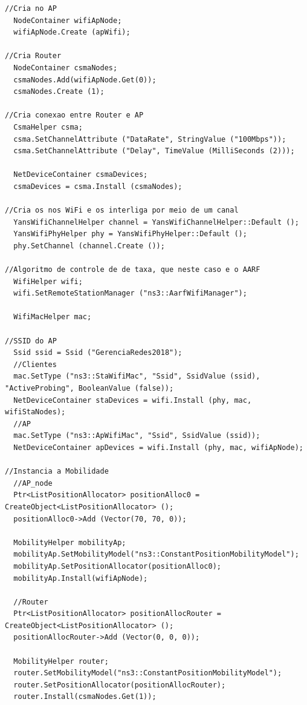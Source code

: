 \documentclass[12pt]{article}
\begin{document}
\begin{lstlisting}
//Cria no AP
  NodeContainer wifiApNode;
  wifiApNode.Create (apWifi);

//Cria Router
  NodeContainer csmaNodes;
  csmaNodes.Add(wifiApNode.Get(0));
  csmaNodes.Create (1);

//Cria conexao entre Router e AP
  CsmaHelper csma;
  csma.SetChannelAttribute ("DataRate", StringValue ("100Mbps"));
  csma.SetChannelAttribute ("Delay", TimeValue (MilliSeconds (2)));

  NetDeviceContainer csmaDevices;
  csmaDevices = csma.Install (csmaNodes);

//Cria os nos WiFi e os interliga por meio de um canal
  YansWifiChannelHelper channel = YansWifiChannelHelper::Default ();
  YansWifiPhyHelper phy = YansWifiPhyHelper::Default ();
  phy.SetChannel (channel.Create ());

//Algoritmo de controle de de taxa, que neste caso e o AARF
  WifiHelper wifi;
  wifi.SetRemoteStationManager ("ns3::AarfWifiManager");

  WifiMacHelper mac;

//SSID do AP
  Ssid ssid = Ssid ("GerenciaRedes2018");
  //Clientes
  mac.SetType ("ns3::StaWifiMac", "Ssid", SsidValue (ssid), "ActiveProbing", BooleanValue (false));
  NetDeviceContainer staDevices = wifi.Install (phy, mac, wifiStaNodes);
  //AP
  mac.SetType ("ns3::ApWifiMac", "Ssid", SsidValue (ssid));
  NetDeviceContainer apDevices = wifi.Install (phy, mac, wifiApNode);

//Instancia a Mobilidade
  //AP_node
  Ptr<ListPositionAllocator> positionAlloc0 = CreateObject<ListPositionAllocator> ();
  positionAlloc0->Add (Vector(70, 70, 0));

  MobilityHelper mobilityAp;
  mobilityAp.SetMobilityModel("ns3::ConstantPositionMobilityModel");
  mobilityAp.SetPositionAllocator(positionAlloc0);
  mobilityAp.Install(wifiApNode);

  //Router
  Ptr<ListPositionAllocator> positionAllocRouter = CreateObject<ListPositionAllocator> ();
  positionAllocRouter->Add (Vector(0, 0, 0));

  MobilityHelper router;
  router.SetMobilityModel("ns3::ConstantPositionMobilityModel");
  router.SetPositionAllocator(positionAllocRouter);
  router.Install(csmaNodes.Get(1));


\end{lstlisting}
\end{document}
